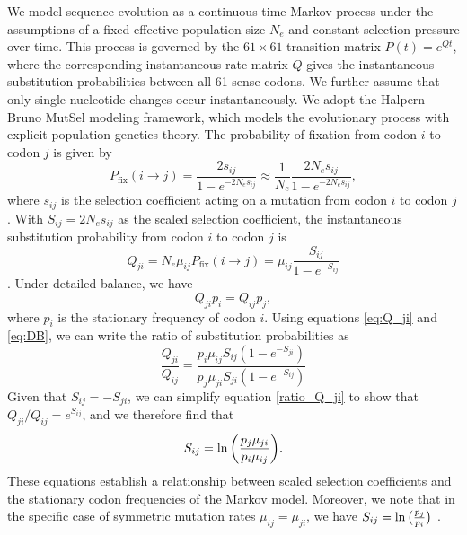 \documentclass{pnastwo}
\begin{document}
\begin{article}
We model sequence evolution as a continuous-time Markov process \cite{Yang2006} under the assumptions of a fixed effective population size $N_e$ and constant selection pressure over time. This process is governed by the $61 \times 61$ transition matrix $P(t) = e^{Qt}$, where the corresponding instantaneous rate matrix $Q$ gives the instantaneous substitution probabilities between all 61 sense codons. We further assume that only single nucleotide changes occur instantaneously. We adopt the Halpern-Bruno \cite{HalpernBruno1998,YangNielsen2008,Thorne2012} MutSel modeling framework, which models the evolutionary process with explicit population genetics theory. The probability of fixation from codon $i$ to codon $j$ is given by 
\begin{equation}\label{eq:pfix}
P_\text{fix}(i \rightarrow j) = \frac{2s_{ij}}{1 - e^{-2N_es_{ij}}} \approx \frac{1}{N_e}\frac{2N_es_{ij}}{1 - e^{-2N_es_{ij}}} , 
\end{equation} 
where $s_{ij}$ is the selection coefficient acting on a mutation from codon $i$ to codon $j$ \cite{Kimura1962,HalpernBruno1998,YangNielsen2008}. With $S_{ij} = 2N_es_{ij}$ as the scaled selection coefficient, the instantaneous substitution probability from codon $i$ to codon $j$ is 
\begin{equation}\label{eq:Q_ji}
Q_{ji} = N_e\mu_{ij}P_\text{fix}(i \rightarrow j) = \mu_{ij}\frac{S_{ij}}{1 - e^{-S_{ij}}}
\end{equation} 
\cite{HalpernBruno1998,SellaHirsh2005}. Under detailed balance, we have 
\begin{equation}\label{eq:DB}
Q_{ji}p_i = Q_{ij}p_j,
\end{equation} 
where $p_i$ is the stationary frequency of codon $i$. Using equations \eqref{eq:Q_ji} and \eqref{eq:DB}, we can write the ratio of substitution probabilities as 
\begin{equation}\label{ratio_Q_ji}
\frac{Q_{ji}}{Q_{ij}} = \frac{p_i \mu_{ij} S_{ij} (1-e^{-S_{ji}})}{p_j \mu_{ji} S_{ji} (1-e^{-S_{ij}})} 
\end{equation}
Given that $S_{ij} = -S_{ji}$, we can simplify equation \eqref{ratio_Q_ji} to show that $Q_{ji}/Q_{ij} = e^{S_{ij}}$, and we therefore find that
\begin{equation}\label{s_pmu}
S_{ij} = \ln\bigg{(}     \frac{p_j\mu_{ji}}{p_i\mu_{ij}}\bigg{)}. 
\end{equation}
These equations establish a relationship between scaled selection coefficients and the stationary codon frequencies of the Markov model. Moreover, we note that in the specific case of symmetric mutation rates $\mu_{ij} = \mu_{ji}$, we have $S_{ij} = \ln\big{(}{\frac{p_j} {p_i}}\big{)}$ \cite{SellaHirsh2005}. 



\end{article}
\end{document}
